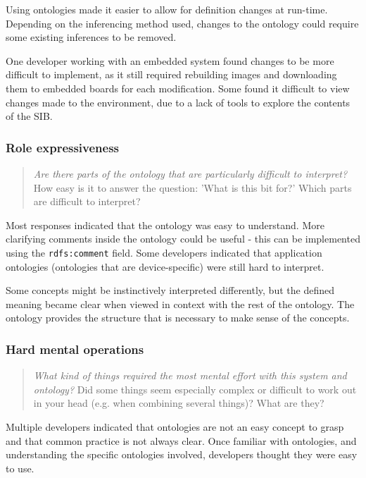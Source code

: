 Using ontologies made it easier to allow for definition changes at run-time. Depending on the inferencing method used, changes to the ontology could require some existing inferences to be removed. 

One developer working with an embedded system found changes to be more difficult to implement, as it still required rebuilding images and downloading them to embedded boards for each modification. Some found it difficult to view changes made to the environment, due to a lack of tools to explore the contents of the \ac{SIB}.


\subsubsection{Role expressiveness}

\begin{quote}
	\emph{Are there parts of the ontology that are particularly difficult to interpret?}
	How easy is it to answer the question: 'What is this bit for?' Which parts are difficult to interpret?
\end{quote}

Most responses indicated that the ontology was easy to understand. More clarifying comments inside the ontology could be useful - this can be implemented using the \texttt{rdfs:comment} field. Some developers indicated that application ontologies (ontologies that are device-specific) were still hard to interpret. 

Some concepts might be instinctively interpreted differently, but the defined meaning became clear when viewed in context with the rest of the ontology. The ontology provides the structure that is necessary to make sense of the concepts.


\subsubsection{Hard mental operations}

\begin{quote}
	\emph{What kind of things required the most mental effort with this system and ontology?}
	Did some things seem especially complex or difficult to work out in your head (e.g. when combining several things)? What are they?
\end{quote}

Multiple developers indicated that ontologies are not an easy concept to grasp and that common practice is not always clear. Once familiar with ontologies, and understanding the specific ontologies involved, developers thought they were easy to use.  

